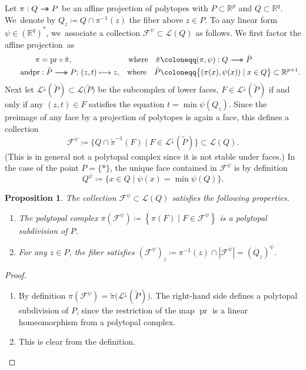 \documentclass[JEP,XML,SOM,Unicode,NoFloatCountersInSection]{cedram}
\let\mathcal\mathscr
\def\mto{\mathchoice{\longmapsto}{\mapsto}{\mapsto}{\mapsto}}
\def\ltwoheadrightarrow{\longrightarrow\hspace*{-5mm}\longrightarrow}
\def\stwoheadrightarrow{\rightarrow\hspace*{-3mm}\rightarrow}
\def\twoheadrightarrow{\mathchoice{\ltwoheadrightarrow}{\stwoheadrightarrow}{\stwoheadrightarrow}{\stwoheadrightarrow}}
\theoremstyle{plain}
\newtheorem{proposition}{Proposition}
\theoremstyle{definition}
\newcommand{\RR}{\mathbb{R}}
\newcommand{\La}{\mathcal{L}}
\newcommand{\sF}{\mathcal{F}}
\DeclareMathOperator{\pr}{pr}
\begin{document}
Let $\pi: Q\twoheadrightarrow P$ be an affine projection of polytopes with
$P\subset \RR^p$ and $Q\subset \RR^q$.
We~denote by $Q_z\coloneqq Q\cap \pi^{-1}(z)$ the fiber above $z\in P$.
To any linear form $\psi\in (\RR^q)^{\ast}$, we~associate a
collection
$\sF^\psi\subset \La(Q)$ as follows.
We first factor the affine projection~as\vspace*{-3pt}
\begin{align*}
\pi&=\mathrm{pr}\circ \tilde{\pi},& \text{where} \quad
\tilde{\pi}&\coloneqq (\pi, \psi): Q\twoheadrightarrow \tilde{P}\\
\tag*{and}
\mathrm{pr}&: \tilde{P}\twoheadrightarrow P;\, (z, t)\mto z,&
\text{where}\quad \tilde{P}&\coloneqq \big\{(\pi(x), \psi(x))\mid x\in Q\big\}\subset \RR^{p+1}.
\end{align*}
Next let $\La^{\downarrow}(\tilde P) \subset \La\big(\tilde{P}\big)$ be the subcomplex of lower faces, \ie $F\in \La^{\downarrow}(\tilde P)$ if and only if any $(z, t)\in F$ satisfies the equation
$t = \min \psi(Q_z)$. Since the preimage of any face by a projection of polytopes is again a face, this defines a collection\vspace*{-3pt}\enlargethispage{.5\baselineskip}%
\[\sF^\psi \coloneqq
\big\{Q\cap \tilde{\pi}^{-1}(F) \mid F\in \La^{\downarrow}(\tilde P)
\big\}
\subset \La(Q).\]
(This is in general not a polytopal complex since it is not stable under faces.)
In the case of the point $P=\{\ast\}$, the unique face contained in $\sF^\psi$ is by definition\vspace*{-3pt}
\[Q^\psi\coloneqq\{x\in Q \mid \psi (x) = \min \psi(Q)\}.\]

\begin{proposition}\label{prop:CoherentSubdivision}
The collection $\sF^\psi \subset \La(Q)$ satisfies the following properties.
\begin{enumerate}
\item\label{prop:CoherentSubdivision1} The polytopal complex $\pi(\sF^\psi)\coloneqq\left\{\pi(F)\mid F\in \sF^\psi \right\}$ is a polytopal subdivision of $P$.
\item\label{prop:CoherentSubdivision2} For any $z\in P$, the fiber satisfies $(\sF^\psi)_z \coloneqq\pi^{-1}(z) \cap\left| \sF^\psi\right|=\left(Q_z\right)^\psi$.
\end{enumerate}
\end{proposition}

\skpt
\begin{proof}
\begin{enumerate}
\item By definition $\pi\left(\sF^\psi\right) = \tilde\pi\big(\La^{\downarrow}(\tilde P)\big)$. The right-hand side defines a polytopal subdivision of $P$, since the restriction of the map $\pr$ is a linear homeomorphism from a polytopal complex.
\item This is clear from the definition.\qedhere
\end{enumerate}
\end{proof}
\end{document}
